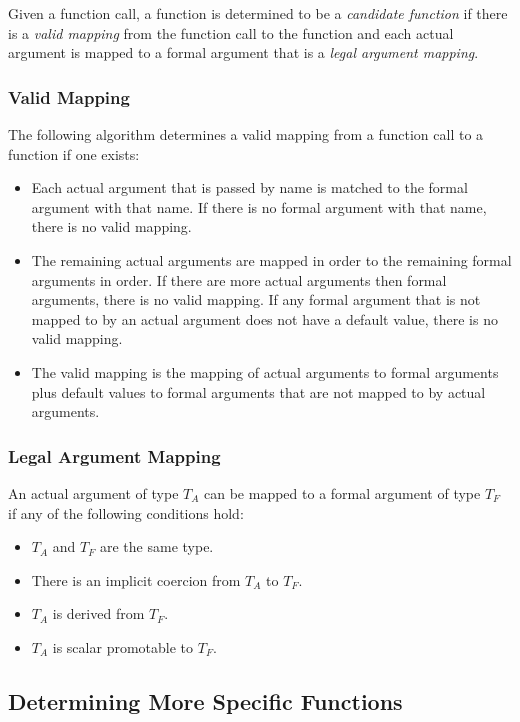 Given a function call, a function is determined to be
a \emph{candidate function} if there is a \emph{valid mapping} from
the function call to the function and each actual argument is mapped
to a formal argument that is a \emph{legal argument mapping}.

\subsubsection{Valid Mapping}
\label{Valid_Mapping}

The following algorithm determines a valid mapping from a function
call to a function if one exists:
\begin{itemize}
\item
Each actual argument that is passed by name is matched to the formal
argument with that name.  If there is no formal argument with that
name, there is no valid mapping.
\item
The remaining actual arguments are mapped in order to the remaining
formal arguments in order.  If there are more actual arguments then
formal arguments, there is no valid mapping.  If any formal argument
that is not mapped to by an actual argument does not have a default
value, there is no valid mapping.
\item
The valid mapping is the mapping of actual arguments to formal
arguments plus default values to formal arguments that are not mapped
to by actual arguments.
\end{itemize}

\subsubsection{Legal Argument Mapping}

An actual argument of type $T_A$ can be mapped to a formal argument of
type $T_F$ if any of the following conditions hold:
\begin{itemize}
\item $T_A$ and $T_F$ are the same type.
\item There is an implicit coercion from $T_A$ to $T_F$.
\item $T_A$ is derived from $T_F$.
\item $T_A$ is scalar promotable to $T_F$.
\end{itemize}

\subsection{Determining More Specific Functions}
\label{Determining_More_Specific_Functions}

